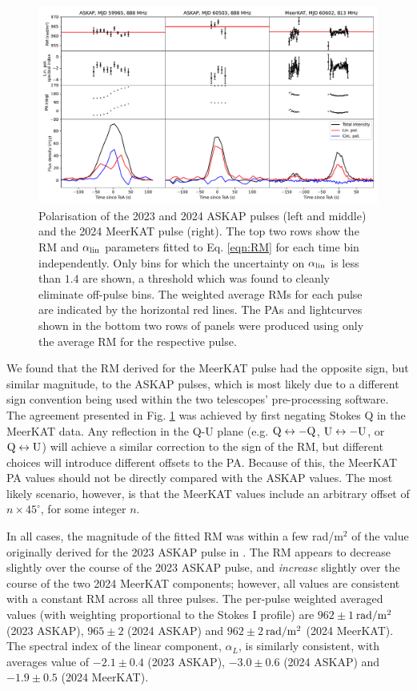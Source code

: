 \documentclass[fleqn,usenatbib]{mnras}
\begin{document}
\begin{figure}[th]
    \centering
    \includegraphics[width=0.98\linewidth]{RM.pdf}
    \caption{Polarisation of the 2023 and 2024 ASKAP pulses (left and middle) and the 2024 MeerKAT pulse (right). The top two rows show the RM and $\alpha_{\rm lin}$ parameters fitted to Eq. \eqref{eqn:RM} for each time bin independently. Only bins for which the uncertainty on $\alpha_{\rm lin}$ is less than $1.4$ are shown, a threshold which was found to cleanly eliminate off-pulse bins. The weighted average RMs for each pulse are indicated by the horizontal red lines. The PAs and lightcurves shown in the bottom two rows of panels were produced using only the average RM for the respective pulse.}
    \label{fig:RM}
\end{figure}

We found that the RM derived for the MeerKAT pulse had the opposite sign, but similar magnitude, to the ASKAP pulses, which is most likely due to a different sign convention being used within the two telescopes' pre-processing software.
The agreement presented in Fig. \ref{fig:RM} was achieved by first negating Stokes Q in the MeerKAT data.
Any reflection in the Q-U plane (e.g. ${\rm Q} \leftrightarrow -{\rm Q}$, ${\rm U} \leftrightarrow -{\rm U}$, or ${\rm Q} \leftrightarrow {\rm U}$) will achieve a similar correction to the sign of the RM, but different choices will introduce different offsets to the PA.
Because of this, the MeerKAT PA values should not be directly compared with the ASKAP values.
The most likely scenario, however, is that the MeerKAT values include an arbitrary offset of $n \times 45^\circ$, for some integer $n$.

In all cases, the magnitude of the fitted RM was within a few rad/m$^2$ of the value originally derived for the 2023 ASKAP pulse in .
The RM appears to decrease slightly over the course of the 2023 ASKAP pulse, and \emph{increase} slightly over the course of the two 2024 MeerKAT components; however, all values are consistent with a constant RM across all three pulses.
The per-pulse weighted averaged values (with weighting proportional to the Stokes I profile) are $962 \pm 1$\,${\rm rad}/{\rm m}^2$ (2023 ASKAP), $965 \pm 2$ (2024 ASKAP) and $962 \pm 2$\,${\rm rad}/{\rm m}^2$ (2024 MeerKAT).
The spectral index of the linear component, $\alpha_L$, is similarly consistent, with averages value of $-2.1 \pm 0.4$ (2023 ASKAP), $-3.0 \pm 0.6$ (2024 ASKAP) and $-1.9 \pm 0.5$ (2024 MeerKAT).
\end{document}
